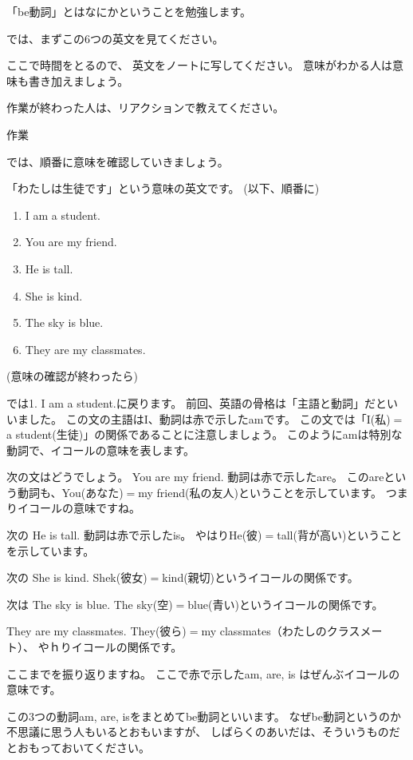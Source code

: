 \documentclass[12pt]{jlreq}
\begin{document}
「be動詞」とはなにかということを勉強します。

{\large \ComputerMouse}

では、まずこの6つの英文を見てください。

ここで時間をとるので、
英文をノートに写してください。
意味がわかる人は意味も書き加えましょう。

作業が終わった人は、リアクションで教えてください。

\hrulefill{}

\hfill{}作業\hfill{}

\hrulefill

では、順番に意味を確認していきましょう。

「わたしは生徒です」という意味の英文です。
(以下、順番に)

\begin{enumerate}
 \item I am a student.
 \item You are my friend.
 \item He is tall.
 \item She is kind.
 \item The sky is blue.
 \item They are my classmates.
\end{enumerate}

(意味の確認が終わったら)

では1. I am a student.に戻ります。
前回、英語の骨格は「主語と動詞」だといいました。
この文の主語はI、動詞は赤で示したamです。
この文では「I(私)$=$a student(生徒)」の関係であることに注意しましょう。
このようにamは特別な動詞で、イコールの意味を表します。

次の文はどうでしょう。
You are my friend.
動詞は赤で示したare。
このareという動詞も、You(あなた)$=$my friend(私の友人)ということを示しています。
つまりイコールの意味ですね。

次の
 He is tall.
動詞は赤で示したis。
やはりHe(彼)$=$tall(背が高い)ということを示しています。

次の
She is kind.
Shek(彼女)$=$kind(親切)というイコールの関係です。

次は
The sky is blue.
The sky(空)$=$blue(青い)というイコールの関係です。

They are my classmates.
They(彼ら)$=$my classmates（わたしのクラスメート）、
やｈりイコールの関係です。

ここまでを振り返りますね。
ここで赤で示したam, are, is はぜんぶイコールの意味です。

この3つの動詞am, are, isをまとめてbe動詞といいます。
なぜbe動詞というのか不思議に思う人もいるとおもいますが、
しばらくのあいだは、そういうものだとおもっておいてください。
\end{document}
